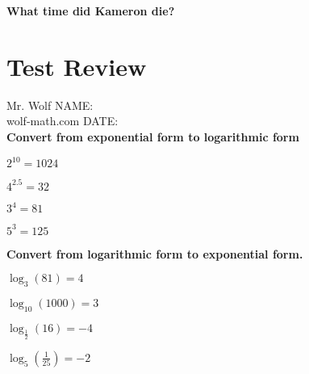\documentclass[12pt]{article}
\begin{document}
\vfill

\textbf{What time did  Kameron die?}


\section{Test Review}

\vspace{12pt}

Mr. Wolf \hfill NAME:\underline{\hspace{3in}}\\ 
wolf-math.com \hfill DATE:\underline{\hspace{2in}}\\

\textbf{Convert from exponential form to logarithmic form}\\

\begin{enumerate}
\begin{multicols}{2}
	\setlength\itemsep{2cm}
	
	\item $2^{10}=1024$\\
	
	\item $4^{2.5}=32$\\
	
	\item $3^4=81$\\
	
	\item $5^3=125$\\

\end{multicols}
\end{enumerate}

\textbf{Convert from logarithmic form to exponential form.}\\

\begin{enumerate}[resume]
\begin{multicols}{2}
	\setlength\itemsep{2cm}
	
	\item $\log_{3}(81)=4$\\
	
	\item $\log_{10}(1000)=3$\\
	
	\item $\log_{\frac{1}{2}}(16)=-4$\\
	
	\item $\log_{5}(\frac{1}{25})=-2$\\

\end{multicols}
\end{enumerate}
\end{document}
